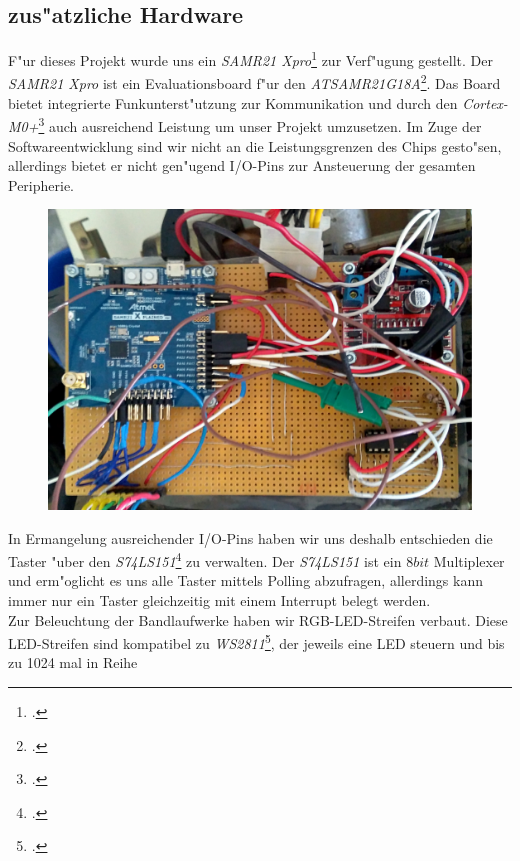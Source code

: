 \documentclass[a4paper]{article}
\begin{document}
  \subsection{zus"atzliche Hardware}
    \label{sec:hardware_additional}
    F"ur dieses Projekt wurde uns ein \textit{SAMR21 Xpro}\footcite{SAMR21XPro} zur Verf"ugung
    gestellt. Der \textit{SAMR21 Xpro} ist ein Evaluationsboard f"ur den
    \textit{ATSAMR21G18A}\footcite{ATSAMR21}. Das Board bietet integrierte Funkunterst"utzung zur
    Kommunikation und durch den \textit{Cortex-M0+}\footcite{CORTEXM0} auch ausreichend Leistung
    um unser Projekt umzusetzen. Im Zuge der Softwareentwicklung sind wir nicht
    an die Leistungsgrenzen des Chips gesto"sen, allerdings bietet er nicht
    gen"ugend I/O-Pins zur Ansteuerung der gesamten Peripherie.\\
    \begin{figure}
      \centering
      \label{figure:Hardwareplattform}
      \includegraphics[scale=0.05]{Platine.jpg}
    \end{figure}
    In Ermangelung ausreichender I/O-Pins haben wir uns deshalb entschieden die Taster "uber den
    \textit{S74LS151}\footcite{S74LS151} zu verwalten. Der \textit{S74LS151} ist
    ein \( 8 bit \) Multiplexer und erm"oglicht es uns alle Taster mittels Polling abzufragen,
    allerdings kann immer nur ein Taster gleichzeitig mit einem Interrupt belegt werden.\\ Zur
    Beleuchtung der Bandlaufwerke haben wir RGB-LED-Streifen verbaut. Diese LED-Streifen sind
    kompatibel zu \textit{WS2811}\footcite{WS2811}, der jeweils eine LED steuern und bis zu 1024 mal in Reihe
\end{document}
